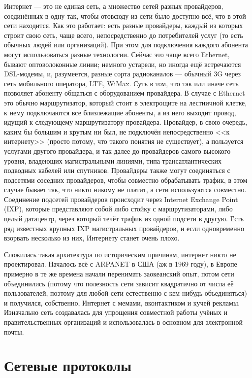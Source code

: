 \documentclass[a5paper]{article}
\begin{document}
Интернет --- это не единая сеть, а множество сетей разных провайдеров, соединённых в одну так, чтобы отовсюду из сети было доступно всё, что в этой сети находится. Как это работает: есть разные провайдеры, каждый из которых строит свою сеть, чаще всего, непосредственно до потребителей услуг (то есть обычных людей или организаций). При этом для подключения каждого абонента могут использоваться разные технологии. Сейчас это чаще всего Ethernet, бывают оптоволоконные линии; немного устарели, но иногда ещё встречаются DSL-модемы, и, разумеется, разные сорта радиоканалов --- обычный 3G через сеть мобильного оператора, LTE, WiMax. Суть в том, что так или иначе сеть позволяет абоненту общаться с оборудованием провайдера. В случае с Ethernet это обычно маршрутизатор, который стоит в электрощите на лестничной клетке, к нему подключаются все близлежащие абоненты, а из него выходит провод, идущий к следующему маршрутизатору провайдера. Провайдер, в свою очередь, каким бы большим и крутым ни был, не подключён непосредственно <<к интернету>> (просто потому, что такого понятия не существует), а пользуется услугами другого провайдера, и так далее до провайдеров самого высокого уровня, владеющих магистральными линиями, типа трансатлантических подводных кабелей или спутников. Провайдеры также могут соединяться с подсетями соседних провайдеров, чтобы совместно обрабатывать трафик, в этом случае бывает так, что никто никому не платит, а сети используются совместно. Соединение подсетей провайдеров происходит через Internet Exchange Point (IXP), которые представляют собой либо стойку с маршрутизаторами, либо целый датацентр, через который течёт трафик из одной подсети в другую. Есть ряд известных крупных IXP магистральных провайдеров, и если одновременно взорвать несколько из них, Интернету станет очень плохо.

Сложилась такая архитектура по историческим причинам, интернет никто не проектировал. Началось всё с ARPANET в США (аж в 1969 году), в Европе примерно в те же времена начали перенимать заокеанский опыт, потом сети объединились (потому что полезность сети зависит квадратично от числа её пользователей, поэтому для любой сети естественно с кем-нибудь объединяться) и получился, собственно, Интернет с мемами, вконтактиком и кучей рекламы. Изначально сеть создавалась для упрощения совместной работы учёных и правительственных организаций и использовалась в основном для электронной почты.

\section{Сетевые протоколы}
\end{document}
